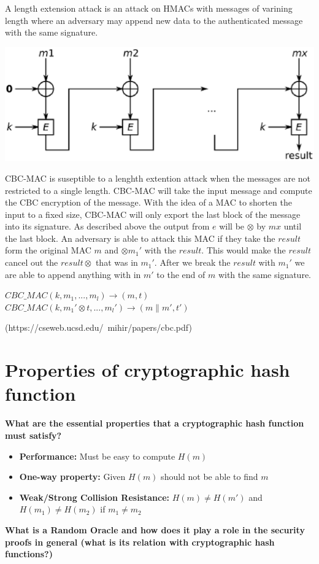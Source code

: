 \documentclass[letterpaper,11pt,notitlepage,fleqn]{article}
\begin{document}
A length extension attack is an attack on HMACs with messages of varining length where an adversary may append new data to the authenticated message with the same signature. 
\begin{center}
    \includegraphics{cbcmac.eps}\\[1cm] %
\end{center}
\indent CBC-MAC is suseptible to a lenghth extention attack when the messages are not restricted to a single length. CBC-MAC will take the input message and compute the CBC encryption of the message. With the idea of a MAC to shorten the input to a fixed size, CBC-MAC will only export the last block of the message into its signature. As described above the output from $e$ will be $\otimes$ by $mx$ until the last block. An adversary is able to attack this MAC if they take the $result$ form
the original MAC $m$ and $\otimes m_{1}'$ with the $result$. This would make the $result$ cancel out the $result \otimes$ that was in $m_{1}'$. After we break the $result$ with $m_{1}'$ we are able to append anything with in $m'$ to the end of $m$ with the same signature.
\begin{center}
    $CBC\_MAC(k,m_{1},..., m_{l}) \rightarrow (m,t)$ \\ $CBC\_MAC(k,m_{1}' \otimes t, ..., m_{l}') \rightarrow (m\|m',t')$
\end{center}
(https://cseweb.ucsd.edu/~mihir/papers/cbc.pdf)

\section{Properties of cryptographic hash function}
\noindent \textbf{What are the essential properties that a cryptographic hash function must satisfy?}
\begin{itemize}
    \item \textbf{Performance:} Must be easy to compute $H(m)$
    \item \textbf{One-way property:} Given $H(m)$ should not be able to find $m$
    \item \textbf{Weak/Strong Collision Resistance:} $H(m) \neq H(m')$ and $H(m_{1}) \neq H(m_{2})$ if $m_{1} \neq m_{2}$
\end{itemize}
\noindent \textbf{What is a Random Oracle and how does it play a role in the security proofs in general 
(what is its relation with cryptographic hash functions?)}
\end{document}

